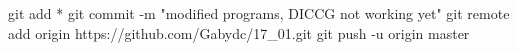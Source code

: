 git add *
git commit -m "modified programs, DICCG not working yet"
git remote add origin https://github.com/Gabydc/17_01.git
git push -u origin master
